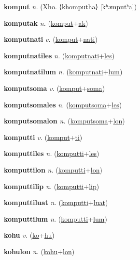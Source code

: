 \textbf{\hypertarget{komput}{komput}} \textit{n.} (Xho. ⟨khomputha⟩ [kʰɔmputʰa])


\textbf{\hypertarget{komputak}{komputak}} \textit{n.} (\hyperlink{komput}{komput}+\allowbreak \hyperlink{ak}{ak})


\textbf{\hypertarget{komputnati}{komputnati}} \textit{v.} (\hyperlink{komput}{komput}+\allowbreak \hyperlink{nati}{nati})


\textbf{\hypertarget{komputnatiles}{komputnatiles}} \textit{n.} (\hyperlink{komputnati}{komputnati}+\allowbreak \hyperlink{les}{les})


\textbf{\hypertarget{komputnatilum}{komputnatilum}} \textit{n.} (\hyperlink{komputnati}{komputnati}+\allowbreak \hyperlink{lum}{lum})


\textbf{\hypertarget{komputsoma}{komputsoma}} \textit{v.} (\hyperlink{komput}{komput}+\allowbreak \hyperlink{soma}{soma})


\textbf{\hypertarget{komputsomales}{komputsomales}} \textit{n.} (\hyperlink{komputsoma}{komputsoma}+\allowbreak \hyperlink{les}{les})


\textbf{\hypertarget{komputsomalon}{komputsomalon}} \textit{n.} (\hyperlink{komputsoma}{komputsoma}+\allowbreak \hyperlink{lon}{lon})


\textbf{\hypertarget{komputti}{komputti}} \textit{v.} (\hyperlink{komput}{komput}+\allowbreak \hyperlink{ti}{ti})


\textbf{\hypertarget{komputtiles}{komputtiles}} \textit{n.} (\hyperlink{komputti}{komputti}+\allowbreak \hyperlink{les}{les})


\textbf{\hypertarget{komputtilon}{komputtilon}} \textit{n.} (\hyperlink{komputti}{komputti}+\allowbreak \hyperlink{lon}{lon})


\textbf{\hypertarget{komputtilip}{komputtilip}} \textit{n.} (\hyperlink{komputti}{komputti}+\allowbreak \hyperlink{lip}{lip})


\textbf{\hypertarget{komputtiluat}{komputtiluat}} \textit{n.} (\hyperlink{komputti}{komputti}+\allowbreak \hyperlink{luat}{luat})


\textbf{\hypertarget{komputtilum}{komputtilum}} \textit{n.} (\hyperlink{komputti}{komputti}+\allowbreak \hyperlink{lum}{lum})


\textbf{\hypertarget{kohu}{kohu}} \textit{v.} (\hyperlink{ko}{ko}+\allowbreak \hyperlink{hu}{hu})


\textbf{\hypertarget{kohulon}{kohulon}} \textit{n.} (\hyperlink{kohu}{kohu}+\allowbreak \hyperlink{lon}{lon})


